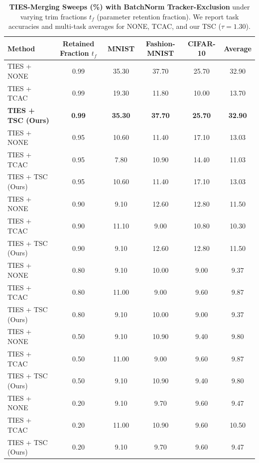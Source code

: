 \documentclass{article}
\theoremstyle{plain}
\theoremstyle{definition}
\theoremstyle{remark}
\begin{document}
\begin{table}[h]
\caption{\textbf{TIES-Merging Sweeps (\%) with BatchNorm Tracker-Exclusion} under varying trim fractions $t_f$ (parameter retention fraction). We report task accuracies and multi-task averages for NONE, TCAC, and our TSC ($\tau = 1.30$).}
\label{tab:ties_sweep}
\vskip 0.1in
\begin{center}
\begin{small}
\begin{sc}
\begin{tabular}{lccccc}
\toprule
Method & Retained Fraction $t_f$ & MNIST & Fashion-MNIST & CIFAR-10 & \textbf{Average} \\
\midrule
TIES + NONE & 0.99 & 35.30 & 37.70 & 25.70 & 32.90 \\
TIES + TCAC & 0.99 & 19.30 & 11.80 & 10.00 & 13.70 \\
\textbf{TIES + TSC (Ours)} & \textbf{0.99} & \textbf{35.30} & \textbf{37.70} & \textbf{25.70} & \textbf{32.90} \\
\midrule
TIES + NONE & 0.95 & 10.60 & 11.40 & 17.10 & 13.03 \\
TIES + TCAC & 0.95 & 7.80 & 10.90 & 14.40 & 11.03 \\
TIES + TSC (Ours) & 0.95 & 10.60 & 11.40 & 17.10 & 13.03 \\
\midrule
TIES + NONE & 0.90 & 9.10 & 12.60 & 12.80 & 11.50 \\
TIES + TCAC & 0.90 & 11.10 & 9.00 & 10.80 & 10.30 \\
TIES + TSC (Ours) & 0.90 & 9.10 & 12.60 & 12.80 & 11.50 \\
\midrule
TIES + NONE & 0.80 & 9.10 & 10.00 & 9.00 & 9.37 \\
TIES + TCAC & 0.80 & 11.00 & 9.00 & 9.60 & 9.87 \\
TIES + TSC (Ours) & 0.80 & 9.10 & 10.00 & 9.00 & 9.37 \\
\midrule
TIES + NONE & 0.50 & 9.10 & 10.90 & 9.40 & 9.80 \\
TIES + TCAC & 0.50 & 11.00 & 9.00 & 9.60 & 9.87 \\
TIES + TSC (Ours) & 0.50 & 9.10 & 10.90 & 9.40 & 9.80 \\
\midrule
TIES + NONE & 0.20 & 9.10 & 9.70 & 9.60 & 9.47 \\
TIES + TCAC & 0.20 & 11.00 & 10.90 & 9.60 & 10.50 \\
TIES + TSC (Ours) & 0.20 & 9.10 & 9.70 & 9.60 & 9.47 \\
\bottomrule
\end{tabular}
\end{sc}
\end{small}
\end{center}
\end{table}
\end{document}
